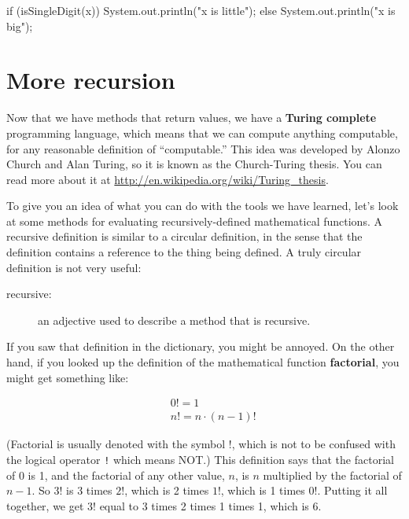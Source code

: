 \documentclass[12pt]{book}
\begin{document}
\begin{code}
    if (isSingleDigit(x)) {
        System.out.println("x is little");
    } else {
        System.out.println("x is big");
    }
\end{code}


\section{More recursion}
\label{factorial}



Now that we have methods that return values, we have a {\bf Turing complete} programming language, which means that we can compute anything computable, for any reasonable definition of ``computable.''
This idea was developed by Alonzo Church and Alan Turing, so it is known as the Church-Turing thesis.
You can read more about it at \url{http://en.wikipedia.org/wiki/Turing_thesis}.

To give you an idea of what you can do with the tools we have learned, let's look at some methods for evaluating recursively-defined mathematical functions.
A recursive definition is similar to a circular definition, in the sense that the definition contains a reference to the thing being defined.
A truly circular definition is not very useful:

\begin{description}
\item[recursive:] an adjective used to describe a method that is recursive.
\end{description}

If you saw that definition in the dictionary, you might be annoyed.
On the other hand, if you looked up the definition of the mathematical function {\bf factorial}, you might get something like:

\begin{eqnarray*}
&&  0! = 1 \\
&&  n! = n \cdot(n-1)!
\end{eqnarray*}

(Factorial is usually denoted with the symbol $!$, which is not to be confused with the logical operator {\tt !} which means NOT.)
This definition says that the factorial of 0 is 1, and the factorial of any other value, $n$, is $n$ multiplied by the factorial of $n-1$.  So $3!$ is 3 times $2!$, which is 2 times $1!$, which is 1 times $0!$.
Putting it all together, we get $3!$ equal to 3 times 2 times 1 times 1, which is 6.
\end{document}
